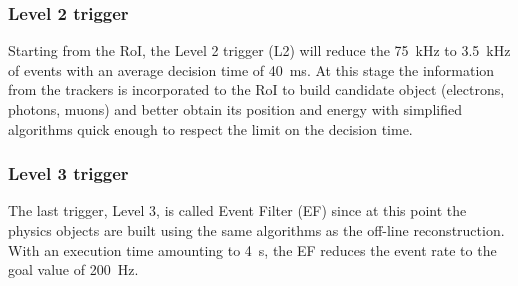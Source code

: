 \subsubsection{Level 2 trigger}\label{sec:lvl2}

Starting from the RoI, the Level 2 trigger (L2) will reduce the 75~kHz to
3.5~kHz of events with an average decision time of 40~ms. At this
stage the information from the trackers is incorporated to the RoI
to build candidate object (electrons, photons, muons) and 
better obtain its position and energy with simplified algorithms
quick enough to respect the limit on the decision time.

\subsubsection{Level 3 trigger}\label{sec:lvl3}

The last trigger, Level 3, is called Event Filter (EF) since
at this point the physics objects are built using the same
algorithms as the off-line reconstruction. With an execution time
amounting to 4~s, the EF reduces the event rate to the goal value
of 200~Hz.

